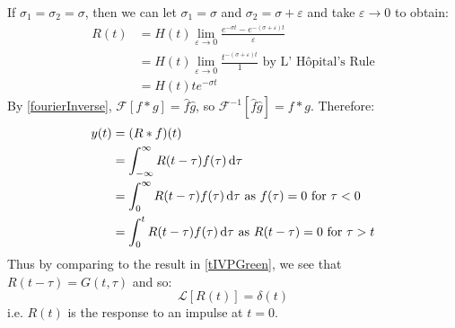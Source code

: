 \documentclass[../main.tex]{subfiles}
\begin{document}
If $\sigma_1 = \sigma_2 = \sigma$, then we can let $\sigma_1 = \sigma$ and $\sigma_2 = \sigma + \varepsilon$ and take $\varepsilon \to 0$ to obtain:
\begin{align}
  R(t) &= H(t) \lim_{\varepsilon \to 0} \frac{e^{-\sigma t} - e^{-(\sigma + \varepsilon)t}}{\varepsilon} \nonumber \\
       &= H(t) \lim_{\varepsilon \to 0} \frac{t ^{-(\sigma + \varepsilon)t}}{1} \text{ by L' H\^opital's Rule} \nonumber \\
       &= H(t) t e^{-\sigma t} \label{RRepeated}
\end{align}
By \cref{fourierInverse}, $\mathcal{F}[f \ast g] = \hat{f}\hat{g}$, so $\mathcal{F}^{-1}[\hat{f}\hat{g}] = f \ast g$.
Therefore:
\begin{align*}
  y(t) &= (R \ast f)(t) \\
       &= \int_{-\infty}^{\infty} R(t - \tau) f(\tau) \d{\tau} \\
       &= \int_{0}^{\infty} R(t - \tau) f(\tau) \d{\tau} \text{ as $f(\tau) = 0$ for $\tau < 0$} \\
       &= \int_{0}^{t} R(t - \tau)f(\tau) \d{\tau} \text{ as $R(t - \tau) = 0$ for $\tau > t$}
\end{align*}
Thus by comparing to the result in \cref{tIVPGreen}, we see that $R(t - \tau) = G(t, \tau)$ and so:
\[
  \mathcal{L}[R(t)] = \delta(t)
\]
i.e. $R(t)$ is the response to an impulse at $t = 0$.
\end{document}
